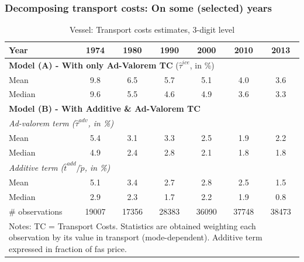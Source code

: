 \documentclass[10 pt,Helvetica, french]{beamer}
\begin{document}
\begin{frame}
\frametitle{Decomposing transport costs: On some (selected) years }
\footnotesize
\begin{table}[htbp]
  \centering
  \caption{Vessel: Transport costs estimates, 3-digit level}
\begin{center}
    \begin{tabular}{l|cccccc}
   \hline\hline
Year         & 1974  & 1980  & 1990  & 2000  & 2010  & 2013   \\
 \hline
   \multicolumn{7}{l}{\textbf{Model (A) - With only Ad-Valorem TC} ($\widehat{\tau}^{ice}$, in \%)}  \\
   \hline
Mean  & 9.8 & 6.5 & 5.7 & 5.1 & 4.0 & 3.6  \\
Median & 9.6 & 5.5 & 4.6 & 4.9 & 3.6 & 3.3  \\
\hline
\multicolumn{7}{l}{\textbf{Model (B) - With Additive \& Ad-Valorem TC}}    \\
\hline
\multicolumn{7}{l}{\textit{Ad-valorem term ($\widehat{\tau}^{adv}$, in \%)} } \\
\hline
Mean  & 5.4 & 3.1 & 3.3 & 2.5 & 1.9 & 2.2 \\
Median & 4.9 & 2.4 & 2.8 & 2.1 & 1.8 & 1.8  \\
\hline
\multicolumn{7}{l}{\textit{Additive term ($\widehat{t}^{add}/\widetilde{p}$, in \%)}}  \\
\hline
Mean  & 5.1 & 3.4 & 2.7 & 2.8 & 2.5 & 1.5  \\
Median & 2.9 & 2.3 & 1.7 & 2.2 & 1.9 & 0.8 \\
\hline
 \# observations & 19007 & 17356 & 28383 & 36090 & 37748 & 38473 \\
\hline\hline
\multicolumn{7}{l}{\parbox[l]{8cm}{ \vspace{7pt}\scriptsize{Notes: TC = Transport Costs. Statistics are obtained weighting each observation by its value in transport (mode-dependent). Additive term expressed in fraction of fas price.}}}
\end{tabular}%
\end{center} \label{tab:result_ves_3d_detail}
\end{table}%
\hyperlink{slide_result1_more}{}
\normalsize

\end{frame}
\end{document}
